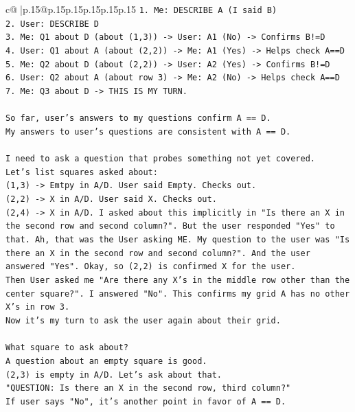 \documentclass{article}
\begin{document}
{\begin{supertabular}{c@{$\;$}|p{.15\linewidth}@{}p{.15\linewidth}p{.15\linewidth}p{.15\linewidth}p{.15\linewidth}p{.15\linewidth}}
{{{\texttt{1. Me: DESCRIBE A (I said B)} \\
\texttt{2. User: DESCRIBE D} \\
\texttt{3. Me: Q1 about D (about (1,3)) {-}> User: A1 (No) {-}> Confirms B!=D} \\
\texttt{4. User: Q1 about A (about (2,2)) {-}> Me: A1 (Yes) {-}> Helps check A==D} \\
\texttt{5. Me: Q2 about D (about (2,2)) {-}> User: A2 (Yes) {-}> Confirms B!=D} \\
\texttt{6. User: Q2 about A (about row 3) {-}> Me: A2 (No) {-}> Helps check A==D} \\
\texttt{7. Me: Q3 about D {-}> THIS IS MY TURN.} \\
\\ 
\texttt{So far, user's answers to my questions confirm A == D.} \\
\texttt{My answers to user's questions are consistent with A == D.} \\
\\ 
\texttt{I need to ask a question that probes something not yet covered.} \\
\texttt{Let's list squares asked about:} \\
\texttt{(1,3) {-}> Emtpy in A/D. User said Empty. Checks out.} \\
\texttt{(2,2) {-}> X in A/D. User said X. Checks out.} \\
\texttt{(2,4) {-}> X in A/D. I asked about this implicitly in "Is there an X in the second row and second column?". But the user responded "Yes" to that. Ah, that was the User asking ME. My question to the user was "Is there an X in the second row and second column?". And the user answered "Yes". Okay, so (2,2) is confirmed X for the user.} \\
\texttt{Then User asked me "Are there any X's in the middle row other than the center square?". I answered "No". This confirms my grid A has no other X's in row 3.} \\
\texttt{Now it's my turn to ask the user again about their grid.} \\
\\ 
\texttt{What square to ask about?} \\
\texttt{A question about an empty square is good.} \\
\texttt{(2,3) is empty in A/D. Let's ask about that.} \\
\texttt{"QUESTION: Is there an X in the second row, third column?"} \\
\texttt{If user says "No", it's another point in favor of A == D.} \\
}}}
\end{supertabular}}
\end{document}
